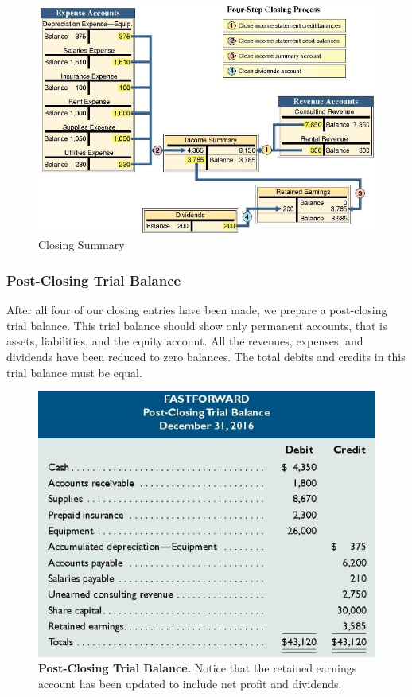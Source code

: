 \documentclass[../main.tex]{subfiles}
\begin{document}
	\begin{figure}[ht]
		\centering
		\includegraphics[width=1\columnwidth]{images/c4/closing_summary.png}
		\caption{Closing Summary}
	\end{figure}
	
	\subsubsection{Post-Closing Trial Balance}
	
	After all four of our closing entries have been made, we prepare a 
	post-closing trial balance. This trial balance should show only permanent 
	accounts, that is assets, liabilities, and the equity account. All the 
	revenues, expenses, and dividends have been reduced to zero balances. The 
	total debits and credits in this trial balance must be equal.
	
	\begin{figure}[ht]
		\centering
		\includegraphics[width=0.9\columnwidth]{images/c4/post_closing_trial_balance.png}
		\caption{\textbf{Post-Closing Trial Balance.} Notice that the retained 
		earnings account has been updated to include net profit and dividends.}
	\end{figure}
	
	
\end{document}
